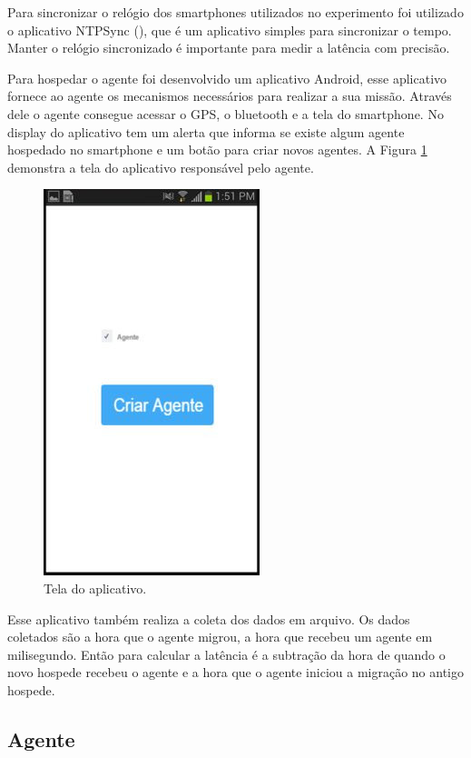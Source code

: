Para sincronizar o relógio dos smartphones utilizados no experimento foi utilizado o aplicativo NTPSync (\cite{Ntpsync:2015}), que é um aplicativo simples para sincronizar o tempo. Manter o relógio sincronizado é importante para medir a latência com precisão. 


Para hospedar o agente foi desenvolvido um aplicativo Android, esse aplicativo fornece ao agente os mecanismos necessários para realizar a sua missão. Através dele o agente consegue acessar o GPS, o bluetooth e a tela do smartphone. No display do aplicativo tem um alerta que informa se existe algum agente hospedado no smartphone e um botão para criar novos agentes. A Figura \ref{fig:appScreen} demonstra a tela do aplicativo responsável pelo agente.

\begin{figure}[htbp]
	\centering
	\includegraphics[scale=0.5]{metodologia/figuras/appScreen.jpg}
	\caption{Tela do aplicativo.}
	\label{fig:appScreen}
\end{figure}

Esse aplicativo também realiza a coleta dos dados em arquivo. Os dados coletados são a hora que o agente migrou, a hora que recebeu um agente em milisegundo. Então para calcular a latência é a subtração da hora de quando o novo hospede recebeu o agente e a hora que o agente iniciou a migração no antigo hospede.

\subsection{Agente}

